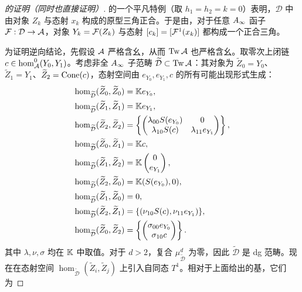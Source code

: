 \begin{proof}[的证明（同时也直接证明）]
的一个平凡特例（取 $h_1=h_2=k=0$）表明，$\mathcal D$ 中由对象 $Z_k$ 与态射 $x_k$ 构成的原型三角正合。于是由，对于任意 $A_\infty$ 函子 $\mathcal F:\mathcal D\to\mathcal A$，对象 $Y_k=\mathcal F(Z_k)$ 与态射 $[c_k]=[\mathcal F^1(x_k)]$ 都构成一个正合三角。

为证明逆向结论，先假设 $\mathcal A$ 严格含幺，从而 $\operatorname{Tw}\mathcal A$ 也严格含幺。取零次上闭链 $c\in\hom^0_{\mathcal A}(Y_0,Y_1)$。考虑非全 $A_\infty$ 子范畴 $\widetilde{\mathcal D}\subset\operatorname{Tw}\mathcal A$：其对象为 $\widetilde Z_0=Y_0$、$\widetilde Z_1=Y_1$、$\widetilde Z_2=\operatorname{Cone}(c)$，态射空间由 $e_{Y_0},e_{Y_1},c$ 的所有可能出现形式生成：
\begin{align*}
\hom_{\widetilde{\mathcal D}}(\widetilde Z_0,\widetilde Z_0)&=\mathbb K e_{Y_0},\\
\hom_{\widetilde{\mathcal D}}(\widetilde Z_1,\widetilde Z_1)&=\mathbb K e_{Y_1},\\
\hom_{\widetilde{\mathcal D}}(\widetilde Z_2,\widetilde Z_2)&=\left\{\begin{pmatrix}\lambda_{00}S(e_{Y_0})&0\\\lambda_{10}S(c)&\lambda_{11}e_{Y_1}\end{pmatrix}\right\},\\
\hom_{\widetilde{\mathcal D}}(\widetilde Z_0,\widetilde Z_1)&=\mathbb K c,\\
\hom_{\widetilde{\mathcal D}}(\widetilde Z_1,\widetilde Z_2)&=\mathbb K\begin{pmatrix}0\\e_{Y_1}\end{pmatrix},\\
\hom_{\widetilde{\mathcal D}}(\widetilde Z_2,\widetilde Z_0)&=\mathbb K(S(e_{Y_0}),0),\\
\hom_{\widetilde{\mathcal D}}(\widetilde Z_1,\widetilde Z_0)&=0,\\
\hom_{\widetilde{\mathcal D}}(\widetilde Z_2,\widetilde Z_1)&=\{(\nu_{10}S(c),\nu_{11}e_{Y_1})\},\\
\hom_{\widetilde{\mathcal D}}(\widetilde Z_0,\widetilde Z_2)&=\left\{\begin{pmatrix}\sigma_{00}e_{Y_0}\\\sigma_{10}c\end{pmatrix}\right\}.
\end{align*}
其中 $\lambda,\nu,\sigma$ 均在 $\mathbb K$ 中取值。对于 $d>2$，复合 $\mu^d_{\widetilde{\mathcal D}}$ 为零，因此 $\widetilde{\mathcal D}$ 是 dg 范畴。现在在态射空间 $\hom_{\widetilde{\mathcal D}}(\widetilde Z_i,\widetilde Z_j)$ 上引入自同态 $T^1$。相对于上面给出的基，它们为

\end{proof}
